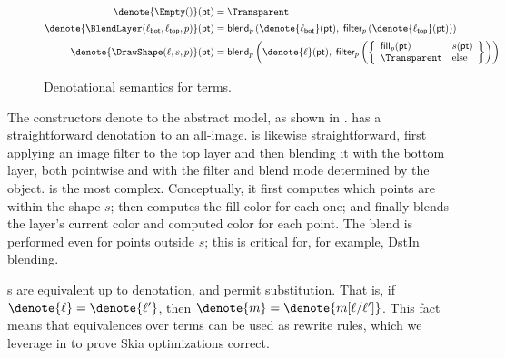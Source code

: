 \begin{figure}
  \begin{align*}
    \denote{\Empty()}(\textsf{pt})
    &= \Transparent\\[2pt]
    \denote{\BlendLayer(\ell_\textsf{bot}, \ell_\textsf{top}, p)}(\mathsf{pt})
    &= \mathsf{blend}_p\left(\denote{\mathsf{\ell_{bot}}}(\mathsf{pt}),\;
        \textsf{filter}_p\left(\denote{\mathsf{\ell_{top}}}(\mathsf{pt})\right)
      \right) \\[2pt]
    \denote{\DrawShape(\ell, s, p)}(\mathsf{pt})
    &= \mathsf{blend}_p\left(\denote{\ell}(\mathsf{pt}),\;
      \textsf{filter}_p\left(
       \left\{
       \begin{array}{ll}
         \mathsf{fill}_p(\mathsf{pt}) & s(\mathsf{pt}) \\
         \Transparent & \textrm{else}
       \end{array}
       \right\}
       \right)\right)\\
  \end{align*}
  \caption{Denotational semantics for \Layer terms.}
  \label{fig:denote}
\end{figure}

The \layer constructors denote to the abstract model,
  as shown in .
\Empty has a straightforward denotation
  to an all-\Transparent image.
\BlendLayer is likewise straightforward,
  first applying an image filter to the top layer
  and then blending it with the bottom layer,
  both pointwise and with
  the filter and blend mode determined by the \Paint object.
\DrawShape is the most complex.
Conceptually, it first computes which points
  are within the shape $s$;
  then computes the fill color for each one;
  and finally blends the layer's current color
  and computed color for each point.
The blend is performed even for points outside $s$;
  this is critical for, for example, \textsf{DstIn} blending.

\Layer{}s are equivalent up to denotation,
  and permit substitution.
That is, if $\denote{\ell} = \denote{\ell'}$,
  then $\denote{m} = \denote{m[\ell/\ell']}$.
This fact means that equivalences over \Layer terms
  can be used as rewrite rules,
  which we leverage in 
  to prove Skia optimizations correct.

\subsection{\texorpdfstring{\muskia}{muSkia}}
\label{subsec:muskia}

